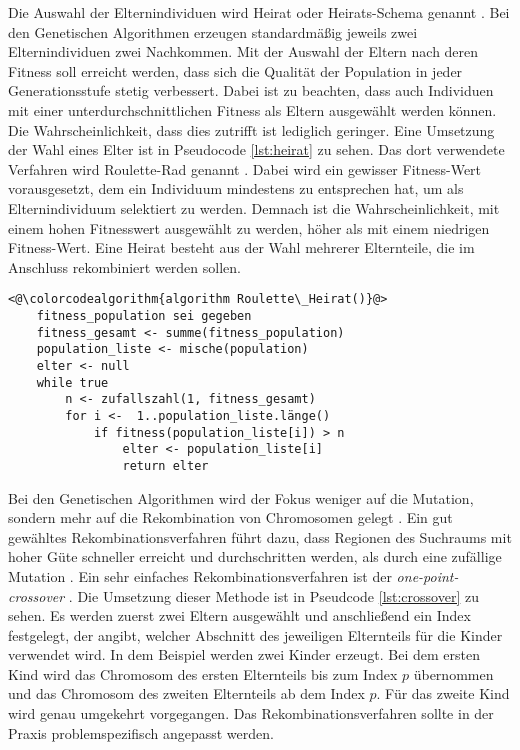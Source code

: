 Die Auswahl der Elternindividuen wird Heirat oder Heirats-Schema genannt \cite[S. 204]{schoeneburg}. Bei den Genetischen Algorithmen erzeugen standardmäßig jeweils zwei Elternindividuen zwei Nachkommen. 
Mit der Auswahl der Eltern nach deren Fitness soll erreicht werden, dass sich die Qualität der Population in jeder Generationsstufe stetig verbessert.
Dabei ist zu beachten, dass auch Individuen mit einer unterdurchschnittlichen Fitness als Eltern ausgewählt werden können. Die Wahrscheinlichkeit, dass dies zutrifft ist lediglich geringer.
Eine Umsetzung der Wahl eines Elter ist in Pseudocode \ref{lst:heirat} zu sehen. Das dort verwendete Verfahren wird Roulette-Rad genannt \cite[S. 204]{schoeneburg}. Dabei wird ein gewisser Fitness-Wert vorausgesetzt, dem ein Individuum mindestens zu entsprechen hat, um als Elternindividuum selektiert zu werden. Demnach ist die Wahrscheinlichkeit, mit einem hohen Fitnesswert ausgewählt zu werden, höher als mit einem niedrigen Fitness-Wert. Eine Heirat besteht aus der Wahl mehrerer Elternteile, die im Anschluss rekombiniert werden sollen.
\begin{lstlisting}[caption={Roulette-Rad}, firstnumber=1, captionpos=b,label=lst:heirat]
<@\colorcodealgorithm{algorithm Roulette\_Heirat()}@>
	fitness_population sei gegeben
	fitness_gesamt <- summe(fitness_population)
	population_liste <- mische(population)
	elter <- null
	while true
		n <- zufallszahl(1, fitness_gesamt)
		for i <-  1..population_liste.länge()
			if fitness(population_liste[i]) > n
				elter <- population_liste[i]
				return elter
\end{lstlisting}
Bei den Genetischen Algorithmen wird der Fokus weniger auf die Mutation, sondern mehr auf die Rekombination von Chromosomen gelegt \cite[S. 198]{schoeneburg}. Ein gut gewähltes Rekombinationsverfahren führt dazu, dass Regionen des Suchraums mit hoher Güte schneller erreicht und durchschritten werden, als durch eine zufällige Mutation \cite[S. 198]{schoeneburg}.
Ein sehr einfaches Rekombinationsverfahren ist der \textit{one-point-crossover} \cite[S. 198]{schoeneburg}. Die Umsetzung dieser Methode ist in Pseudcode \ref{lst:crossover} zu sehen. Es werden zuerst zwei Eltern ausgewählt und anschließend ein Index festgelegt, der angibt, welcher Abschnitt des jeweiligen Elternteils für die Kinder verwendet wird.
In dem Beispiel werden zwei Kinder erzeugt. Bei dem ersten Kind wird das Chromosom des ersten Elternteils bis zum Index $p$ übernommen und das Chromosom des zweiten Elternteils ab dem Index $p$. Für das zweite Kind wird genau umgekehrt vorgegangen. Das Rekombinationsverfahren sollte in der Praxis problemspezifisch angepasst werden.
